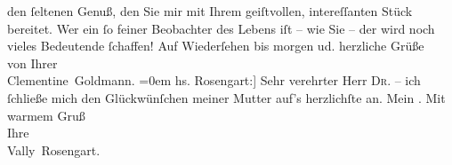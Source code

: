 \begin{ledgroupsized}[t]{13cm}
               den ſeltenen Genuß, den Sie mir mit Ihrem geiſtvollen, {\pb}intereſſanten Stück
               bereitet. Wer ein ſo feiner Beobachter des Lebens iſt – wie Sie – der wird noch
               vieles Bedeutende ſchaffen!\pend
           \pstart
           Auf Wiederſehen bis morgen ud. herzliche Grüße{\\[\baselineskip]}von Ihrer{\\[\baselineskip]}\spacefill\mbox{Clementine Goldmann.}\pend
           \leftskip=0em{}\pstart
           \noindent{}{[}hs. Rosengart:{]} Sehr verehrter Herr \textsc{Dr}. –
               ich ſchließe mich den Glückwünſchen meiner Mutter auf’s herzlichſte an. Mein \label{K_L02795-2v}\label{K_L02795-2h}. Mit warmem Gruß{\\}Ihre{\\}\spacefill\mbox{Vally Rosengart.}\pend
           
         
         \endnumbering{}\end{ledgroupsized}  \newcommand{\dateiname}{L02795}\newcommand{\titel}{Clementine Goldmann und Vally Rosengart an Arthur Schnitzler, [11. 1. 1896]}\newcommand{\editorInnen}{Martin Anton Müller und Laura Untner}
      